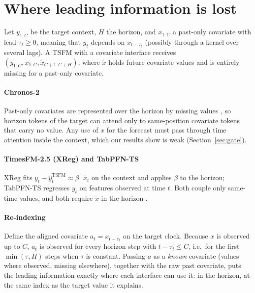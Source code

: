 \documentclass[preprint,11pt,authoryear]{elsarticle}
\begin{document}
\section{Where leading information is lost}
\label{sec:interface}

Let $y_{1:C}$ be the target context, $H$ the horizon, and $x_{1:C}$ a past-only covariate with lead $\tau_t\ge 0$, meaning that $y_t$ depends on $x_{t-\tau_t}$ (possibly through a kernel over several lags). A TSFM with a covariate interface receives $(y_{1:C}, x_{1:C}, \tilde x_{C+1:C+H})$, where $\tilde x$ holds future covariate values and is entirely missing for a past-only covariate.

\paragraph{Chronos-2} Past-only covariates are represented over the horizon by missing values \citep{ansari2025chronos2}, so horizon tokens of the target can attend only to same-position covariate tokens that carry no value. Any use of $x$ for the forecast must pass through time attention inside the context, which our results show is weak (Section~\ref{sec:gate}).

\paragraph{TimesFM-2.5 (XReg) and TabPFN-TS} XReg fits $y_t - \hat y^{\mathrm{TSFM}}_t \approx \beta^\top \tilde x_t$ on the context and applies $\beta$ to the horizon; TabPFN-TS regresses $y_t$ on features observed at time $t$. Both couple only same-time values, and both require $\tilde x$ in the horizon \citep{won2026attenuated,hoo2025tabpfnts}.

\paragraph{Re-indexing} Define the aligned covariate $a_t = x_{t-\tau_t}$ on the target clock. Because $x$ is observed up to $C$, $a_t$ is observed for every horizon step with $t-\tau_t\le C$, i.e.\ for the first $\min(\tau,H)$ steps when $\tau$ is constant. Passing $a$ as a \emph{known} covariate (values where observed, missing elsewhere), together with the raw past covariate, puts the leading information exactly where each interface can use it: in the horizon, at the same index as the target value it explains.
\end{document}
